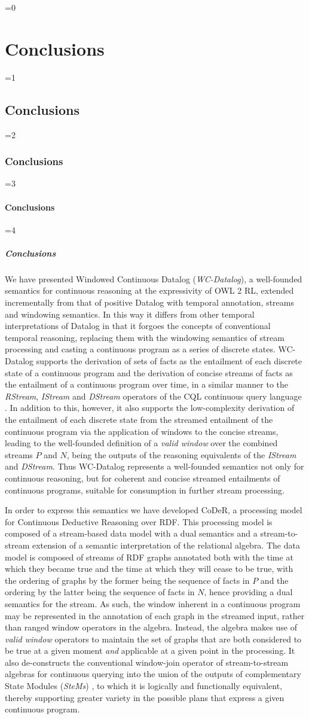 \documentclass[twocolumn,preprint,3p,number]{elsarticle}
\theoremstyle{plain}
\theoremstyle{definition}
\newcounter{nestingdepth}
\newenvironment{nestedsection}[2]{
  \ifnum\value{nestingdepth}=0
    \chapter{#1}
  \else
    \ifnum\value{nestingdepth}=1
      \section{#1}
    \else
      \ifnum\value{nestingdepth}=2
        \subsection{#1}
      \else
        \ifnum\value{nestingdepth}=3
          \subsubsection{#1}
        \else
          \ifnum\value{nestingdepth}=4
            \paragraph{#1}
          \else
            \PackageError{nestedsections}{Maximum nesting level exceeded!}{uh oh!}
          \fi
        \fi
      \fi
    \fi
  \fi
  \addtocounter{nestingdepth}{1}
  \label{sec:#2}
}{\addtocounter{nestingdepth}{-1}}
\begin{document}
\begin{nestedsection}{Conclusions}{conclusions}
  We have presented Windowed Continuous Datalog (\emph{WC-Datalog}), a well-founded semantics for continuous reasoning at the expressivity of OWL 2 RL, extended incrementally from that of positive Datalog with temporal annotation, streams and windowing semantics.
  In this way it differs from other temporal interpretations of Datalog \citep{OrgunWadge92,Tuzhilin93} in that it forgoes the concepts of conventional temporal reasoning, replacing them with the windowing semantics of stream processing and casting a continuous program as a series of discrete states.
  WC-Datalog supports the derivation of sets of facts as the entailment of each discrete state of a continuous program and the derivation of concise streams of facts as the entailment of a continuous program over time, in a similar manner to the \emph{RStream}, \emph{IStream} and \emph{DStream} operators of the CQL continuous query language \citep{CQL}.
  In addition to this, however, it also supports the low-complexity derivation of the entailment of each discrete state from the streamed entailment of the continuous program via the application of windows to the concise streams, leading to the well-founded definition of a \emph{valid window} over the combined streams $P$ and $N$, being the outputs of the reasoning equivalents of the \emph{IStream} and \emph{DStream}.
  Thus WC-Datalog represents a well-founded semantics not only for continuous reasoning, but for coherent and concise streamed entailments of continuous programs, suitable for consumption in further stream processing.

  In order to express this semantics we have developed CoDeR, a processing model for Continuous Deductive Reasoning over RDF.
  This processing model is composed of a stream-based data model with a dual semantics and a stream-to-stream extension of a semantic interpretation of the relational algebra.
  The data model is composed of streams of RDF graphs annotated both with the time at which they became true and the time at which they will cease to be true, with the ordering of graphs by the former being the sequence of facts in $P$ and the ordering by the latter being the sequence of facts in $N$, hence providing a dual semantics for the stream.
  As such, the window inherent in a continuous program may be represented in the annotation of each graph in the streamed input, rather than ranged window operators in the algebra.
  Instead, the algebra makes use of \emph{valid window} operators to maintain the set of graphs that are both considered to be true at a given moment \emph{and} applicable at a given point in the processing.
  It also de-constructs the conventional window-join operator of stream-to-stream algebras for continuous querying into the union of the outputs of complementary State Modules (\emph{SteMs}) \citep{SteMs}, to which it is logically and functionally equivalent, thereby supporting greater variety in the possible plans that express a given continuous program.


\end{nestedsection}
\end{document}

